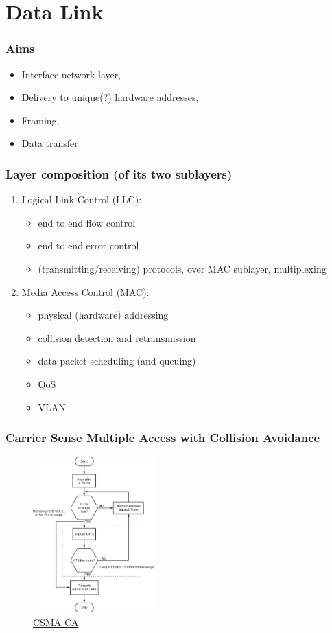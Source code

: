 \section{Data Link}
  \begin{frame}
    \frametitle{Aims}
      \begin{itemize}
        \item Interface network layer,
        \item Delivery to unique(?) hardware addresses,
        \item Framing,
        \item Data transfer
      \end{itemize}
  \end{frame}
  \begin{frame}
    \frametitle{Layer composition (of its two sublayers)}
      \begin{enumerate}
        \item Logical Link Control (LLC):
          \begin{itemize}
            \item end to end flow control
            \item end to end error control
            \item (transmitting/receiving) protocols, over MAC sublayer, multiplexing
          \end{itemize}
        \item Media Access Control (MAC):
          \begin{itemize}
            \item physical (hardware) addressing
            \item collision detection and retransmission
            \item data packet scheduling (and queuing)
            \item QoS
            \item VLAN
          \end{itemize}
      \end{enumerate}
  \end{frame}
  \begin{frame}
    \frametitle{Carrier Sense Multiple Access with Collision Avoidance}
    \begin{figure}[t]
      \centering
      \includegraphics[height=6cm]{./imgs/csma_ca.pdf}
      \caption{\color{blue}\href{https://en.wikipedia.org/wiki/File:Csma_ca.svg}{CSMA CA}}
      \label{fig:csma_ca}
    \end{figure}
    \end{frame}

